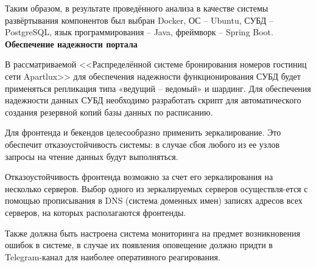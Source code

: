 Таким образом, в результате проведённого анализа в качестве системы развёртывания компонентов был выбран Docker, ОС -- Ubuntu, СУБД -- PostgreSQL, язык программирования -- Java, фреймворк -- Spring Boot. \\

\textbf{Обеспечение надежности портала}

В рассматриваемой <<Распределённой системе бронирования номеров гостиниц сети Apartlux>> для  обеспечения надежности функционирования СУБД  будет применяться  репликация типа «ведущий – ведомый» и шардинг. Для обеспечения надежности данных СУБД необходимо разработать скрипт для автоматического создания резервной копий базы данных по расписанию.

Для фронтенда и бекендов целесообразно применить зеркалирование. Это обеспечит отказоустойчивость системы: в случае сбоя любого из ее узлов запросы на чтение данных будут выполняться. 

Отказоустойчивость фронтенда возможно за счет его зеркалирования на несколько серверов. Выбор одного из зеркалируемых серверов осуществля-ется с помощью прописывания в DNS (система доменных имен) записях адресов всех серверов, на которых располагаются фронтенды. 

Также должна быть настроена система мониторинга на предмет возникновения ошибок в системе, в случае их появления оповещение должно придти в Telegram-канал для наиболее оперативного реагирования.\\

